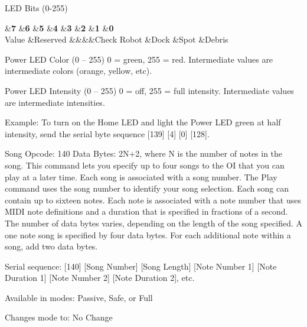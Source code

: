 \begin{Desc}
\begin{description}
L\+E\+D Bits (0-\/255)

\begin{TabularC}{9}
\hline
{}&{\bf 7 }&{\bf 6 }&{\bf 5 }&{\bf 4 }&{\bf 3 }&{\bf 2 }&{\bf 1 }&{\bf 0  }\\
Value &Reserved &&&&Check Robot &Dock &Spot &Debris \\
\end{TabularC}
Power L\+E\+D Color (0 – 255) 0 = green, 255 = red. Intermediate values are intermediate colors (orange, yellow, etc).

Power L\+E\+D Intensity (0 – 255) 0 = off, 255 = full intensity. Intermediate values are intermediate intensities.

Example\+: To turn on the Home L\+E\+D and light the Power L\+E\+D green at half intensity, send the serial byte sequence \mbox{[}139\mbox{]} \mbox{[}4\mbox{]} \mbox{[}0\mbox{]} \mbox{[}128\mbox{]}. \item[{\em 
\hypertarget{group__roomba-lib_gga305e17dfb7050ad83ea49ded2e6a2e24a81a248bb3504b8d3b302aa6037f2df7b}{}R\+O\+O\+M\+B\+A\+\_\+\+S\+O\+N\+G\label{group__roomba-lib_gga305e17dfb7050ad83ea49ded2e6a2e24a81a248bb3504b8d3b302aa6037f2df7b}
}]Song Opcode\+: 140 Data Bytes\+: 2\+N+2, where N is the number of notes in the song. This command lets you specify up to four songs to the O\+I that you can play at a later time. Each song is associated with a song number. The Play command uses the song number to identify your song selection. Each song can contain up to sixteen notes. Each note is associated with a note number that uses M\+I\+D\+I note definitions and a duration that is specified in fractions of a second. The number of data bytes varies, depending on the length of the song specified. A one note song is specified by four data bytes. For each additional note within a song, add two data bytes.
\begin{DoxyItemize}
\item Serial sequence\+: \mbox{[}140\mbox{]} \mbox{[}Song Number\mbox{]} \mbox{[}Song Length\mbox{]} \mbox{[}Note Number 1\mbox{]} \mbox{[}Note Duration 1\mbox{]} \mbox{[}Note Number 2\mbox{]} \mbox{[}Note Duration 2\mbox{]}, etc.
\item Available in modes\+: Passive, Safe, or Full
\item Changes mode to\+: No Change

\end{DoxyItemize}
\end{description}
\end{Desc}
